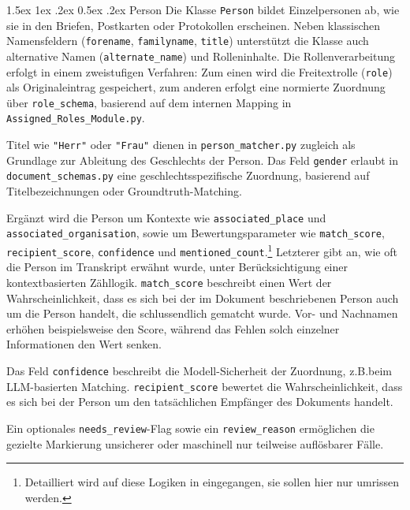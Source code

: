 \documentclass[12pt, a4paper, ngerman, bidi=default]{article}
\makeatletter
\newcommand{\code}[1]{\colorbox{VeryLightGray}{\texttt{#1}}} %
\let\oldparagraph\paragraph%
\renewcommand{\paragraph}{
    \@ifstar%
      \xxxParagraphStar%
      \xxxParagraphNoStar%
 }
\newcommand{\xxxParagraphStar}[1]{\oldparagraph*{#1}\mbox{}}
\newcommand{\xxxParagraphNoStar}[1]{\oldparagraph{#1}\mbox{}}
\renewcommand\paragraph{\@startsection{paragraph}{4}{0em}%
  {1.5ex \@plus1ex \@minus.2ex}%
  {0.5ex \@plus.2ex}%
  {\normalfont\normalsize\bfseries\itshape}}
\makeatother
\begin{document}
\paragraph{Person}
Die Klasse \code{Person} bildet Einzelpersonen ab, wie sie in den Briefen, Postkarten oder Protokollen erscheinen. 
Neben klassischen Namensfeldern (\code{forename}, \code{familyname}, \code{title}) unterstützt die Klasse auch 
alternative Namen (\code{alternate\_name}) und Rolleninhalte. Die Rollenverarbeitung erfolgt in einem zweistufigen Verfahren:
Zum einen wird die Freitextrolle (\code{role}) als Originaleintrag gespeichert, zum anderen erfolgt eine normierte 
Zuordnung über \code{role\_schema}, basierend auf dem internen Mapping in \code{Assigned\_Roles\_Module.py}. 

Titel wie \code{"Herr"} oder \code{"Frau"} dienen in \code{person\_matcher.py} zugleich als Grundlage zur 
Ableitung des Geschlechts der Person. Das Feld \code{gender} erlaubt in \code{document\_schemas.py} eine 
geschlechtsspezifische Zuordnung, basierend auf Titelbezeichnungen oder Groundtruth-Matching. 

Ergänzt wird die Person um Kontexte wie \code{associated\_place} und \code{associated\_organisation}, sowie um Bewertungsparameter 
wie \code{match\_score}, \code{recipient\_score}, \code{confidence} und \code{mentioned\_count}.\footnote{Detailliert wird auf diese Logiken in 
 eingegangen, sie sollen hier nur umrissen werden.} 
Letzterer gibt an, wie oft 
die Person im Transkript erwähnt wurde, unter Berücksichtigung einer kontextbasierten Zähllogik.
\code{match\_score} beschreibt einen Wert der Wahrscheinlichkeit, dass es sich bei der im Dokument beschriebenen Person auch 
um die Person handelt, die schlussendlich gematcht wurde. Vor- und Nachnamen erhöhen beispielsweise den Score, während das
Fehlen solch einzelner Informationen den Wert senken. 

Das Feld \code{confidence} beschreibt die Modell-Sicherheit der Zuordnung, z.B.beim LLM-basierten Matching. 
\code{recipient\_score} bewertet die Wahrscheinlichkeit, dass es sich bei der Person um den tatsächlichen Empfänger des Dokuments handelt. 

Ein optionales \code{needs\_review}-Flag sowie ein \code{review\_reason} ermöglichen die gezielte Markierung unsicherer oder 
maschinell nur teilweise auflösbarer Fälle.
\end{document}
